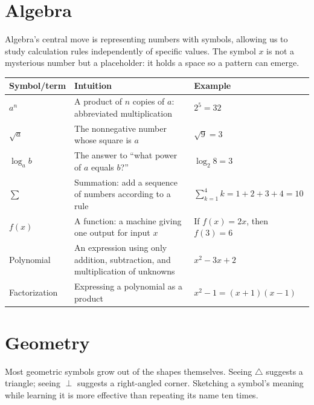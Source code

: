 \section{Algebra}

Algebra's central move is representing numbers with symbols, allowing us to study calculation rules independently of specific values. The symbol $x$ is not a mysterious number but a placeholder: it holds a space so a pattern can emerge.

\begin{center}
\begin{tabular}{lp{4.8cm}p{5.4cm}}
\toprule
Symbol/term & Intuition & Example \\
\midrule
$a^n$ & A product of $n$ copies of $a$: abbreviated multiplication & $2^5=32$ \\
$\sqrt{a}$ & The nonnegative number whose square is $a$ & $\sqrt{9}=3$ \\
$\log_a b$ & The answer to ``what power of $a$ equals $b$?'' & $\log_2 8=3$ \\
$\sum$ & Summation: add a sequence of numbers according to a rule & $\sum_{k=1}^{4}k=1+2+3+4=10$ \\
$f(x)$ & A function: a machine giving one output for input $x$ & If $f(x)=2x$, then $f(3)=6$ \\
Polynomial & An expression using only addition, subtraction, and multiplication of unknowns & $x^2-3x+2$ \\
Factorization & Expressing a polynomial as a product & $x^2-1=(x+1)(x-1)$ \\
\bottomrule
\end{tabular}
\end{center}

\section{Geometry}

Most geometric symbols grow out of the shapes themselves. Seeing $\triangle$ suggests a triangle; seeing $\perp$ suggests a right-angled corner. Sketching a symbol's meaning while learning it is more effective than repeating its name ten times.

